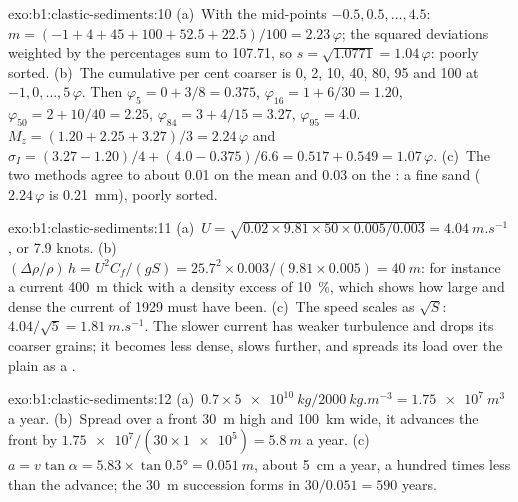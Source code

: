 \begin{solution}{exo:b1:clastic-sediments:10}
(a)~With the mid-points $-0.5, 0.5, \ldots, 4.5$: $m = (-1 + 4 + 45 + 100 + 52.5
+ 22.5)/100 = 2.23\,\varphi$; the squared deviations weighted by the
percentages sum to \num{107.71}, so $s = \sqrt{1.0771} = 1.04\,\varphi$:
poorly sorted. (b)~The cumulative per cent coarser is 0, 2, 10, 40, 80, 95 and
100 at $-1, 0, \ldots, 5\,\varphi$. Then $\varphi_5 = 0 + 3/8 = 0.375$,
$\varphi_{16} = 1 + 6/30 = 1.20$, $\varphi_{50} = 2 + 10/40 = 2.25$,
$\varphi_{84} = 3 + 4/15 = 3.27$, $\varphi_{95} = 4.0$. $M_z = (1.20 + 2.25 +
3.27)/3 = 2.24\,\varphi$ and $\sigma_I = (3.27 - 1.20)/4 + (4.0 - 0.375)/6.6 =
0.517 + 0.549 = 1.07\,\varphi$. (c)~The two methods agree to about
\num{0.01} on the mean and \num{0.03} on the : a fine sand
($2.24\,\varphi$ is \qty{0.21}{mm}), poorly sorted.
\end{solution}

\begin{solution}{exo:b1:clastic-sediments:11}
(a)~$U = \sqrt{0.02 \times 9.81 \times 50 \times 0.005/0.003} =
\qty{4.04}{m.s^{-1}}$, or 7.9 knots. (b)~$(\Delta\rho/\rho)\,h = U^2
C_f/(gS) = 25.7^2 \times 0.003/(9.81 \times 0.005) = \qty{40}{m}$: for instance
a current \qty{400}{m} thick with a density excess of \qty{10}{\percent}, which
shows how large and dense the current of 1929 must have been. (c)~The speed
scales as $\sqrt S$: $4.04/\sqrt 5 = \qty{1.81}{m.s^{-1}}$. The slower current
has weaker turbulence and drops its coarser grains; it becomes less dense, slows
further, and spreads its load over the plain as a .
\end{solution}

\begin{solution}{exo:b1:clastic-sediments:12}
(a)~$0.7 \times \qty{5e10}{kg}/\qty{2000}{kg.m^{-3}} = \qty{1.75e7}{m^3}$ a
year. (b)~Spread over a front \qty{30}{m} high and \qty{100}{km} wide, it
advances the front by $\num{1.75e7}/(30 \times \num{1e5}) = \qty{5.8}{m}$ a
year. (c)~$a = v\tan\alpha = 5.83 \times \tan\ang{0.5} = \qty{0.051}{m}$, about
\qty{5}{cm} a year, a hundred times less than the advance; the
\qty{30}{m} succession forms in $30/0.051 = 590$ years.
\end{solution}

